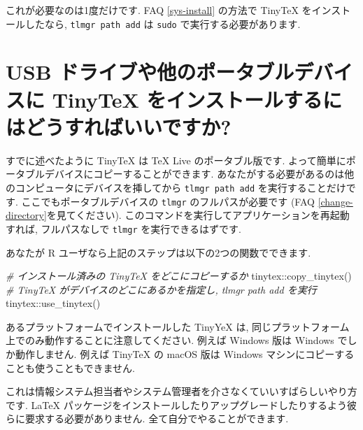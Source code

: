 \documentclass[
  xelatex,ja=standard,jafont=noto]{bxjsreport}
\newenvironment{Shaded}{\begin{snugshade}}{\end{snugshade}}
\newcommand{\CommentTok}[1]{\textcolor[rgb]{0.56,0.35,0.01}{\textit{#1}}}
\newcommand{\FunctionTok}[1]{\textcolor[rgb]{0.00,0.00,0.00}{#1}}
\newcommand{\NormalTok}[1]{#1}
\newcommand{\SpecialCharTok}[1]{\textcolor[rgb]{0.00,0.00,0.00}{#1}}
\begin{document}
これが必要なのは1度だけです. FAQ \ref{sys-install} の方法で TinyTeX
をインストールしたなら, \texttt{tlmgr\ path\ add} は \texttt{sudo}
で実行する必要があります.

\hypertarget{usb-ux30c9ux30e9ux30a4ux30d6ux3084ux4ed6ux306eux30ddux30fcux30bfux30d6ux30ebux30c7ux30d0ux30a4ux30b9ux306b-tinytex-ux3092ux30a4ux30f3ux30b9ux30c8ux30fcux30ebux3059ux308bux306bux306fux3069ux3046ux3059ux308cux3070ux3044ux3044ux3067ux3059ux304b}{%
\section{USB ドライブや他のポータブルデバイスに TinyTeX
をインストールするにはどうすればいいですか?}\label{usb-ux30c9ux30e9ux30a4ux30d6ux3084ux4ed6ux306eux30ddux30fcux30bfux30d6ux30ebux30c7ux30d0ux30a4ux30b9ux306b-tinytex-ux3092ux30a4ux30f3ux30b9ux30c8ux30fcux30ebux3059ux308bux306bux306fux3069ux3046ux3059ux308cux3070ux3044ux3044ux3067ux3059ux304b}}

すでに述べたように TinyTeX は TeX Live のポータブル版です.
よって簡単にポータブルデバイスにコピーすることができます.
あなたがする必要があるのは他のコンピュータにデバイスを挿してから
\texttt{tlmgr\ path\ add} を実行することだけです.
ここでもポータブルデバイスの \texttt{tlmgr} のフルパスが必要です (FAQ
\ref{change-directory}を見てください).
このコマンドを実行してアプリケーションを再起動すれば, フルパスなしで
\texttt{tlmgr} を実行できるはずです.

あなたが R ユーザなら上記のステップは以下の2つの関数でできます.

\begin{Shaded}
\begin{Highlighting}[numbers=left,,]
\CommentTok{\# インストール済みの TinyTeX をどこにコピーするか}
\NormalTok{tinytex}\SpecialCharTok{::}\FunctionTok{copy\_tinytex}\NormalTok{()}
\CommentTok{\# TinyTeX がデバイスのどこにあるかを指定し, tlmgr path add を実行}
\NormalTok{tinytex}\SpecialCharTok{::}\FunctionTok{use\_tinytex}\NormalTok{()}
\end{Highlighting}
\end{Shaded}

あるプラットフォームでインストールした TinyYeX は,
同じプラットフォーム上でのみ動作することに注意してください. 例えば
Windows 版は Windows でしか動作しません. 例えば TinyTeX の macOS 版は
Windows マシンにコピーすることも使うこともできません.

これは情報システム担当者やシステム管理者を介さなくていいすばらしいやり方です.
LaTeX
パッケージをインストールしたりアップグレードしたりするよう彼らに要求する必要がありません.
全て自分でやることができます.
\end{document}
